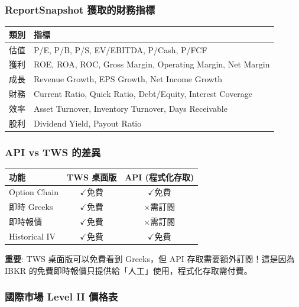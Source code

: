 \documentclass[11pt,a4paper]{article}
\newcommand{\cmark}{\textcolor{successgreen}{$\checkmark$}}
\newcommand{\xmark}{\textcolor{dangered}{$\times$}}
\begin{document}
\subsubsection{ReportSnapshot 獲取的財務指標}

\begin{table}[H]
\centering
\begin{tabular}{@{}ll@{}}
\toprule
\textbf{類別} & \textbf{指標} \\
\midrule
估值 & P/E, P/B, P/S, EV/EBITDA, P/Cash, P/FCF \\
獲利 & ROE, ROA, ROC, Gross Margin, Operating Margin, Net Margin \\
成長 & Revenue Growth, EPS Growth, Net Income Growth \\
財務 & Current Ratio, Quick Ratio, Debt/Equity, Interest Coverage \\
效率 & Asset Turnover, Inventory Turnover, Days Receivable \\
股利 & Dividend Yield, Payout Ratio \\
\bottomrule
\end{tabular}
\end{table}

\subsubsection{API vs TWS 的差異}

\begin{table}[H]
\centering
\begin{tabular}{@{}lcc@{}}
\toprule
\textbf{功能} & \textbf{TWS 桌面版} & \textbf{API (程式化存取)} \\
\midrule
Option Chain & \cmark 免費 & \cmark 免費 \\
即時 Greeks & \cmark 免費 & \xmark 需訂閱 \\
即時報價 & \cmark 免費 & \xmark 需訂閱 \\
Historical IV & \cmark 免費 & \cmark 免費 \\
\bottomrule
\end{tabular}
\end{table}

\begin{tcolorbox}[colback=warningyellow!10,colframe=warningyellow]
\textbf{重要}: TWS 桌面版可以免費看到 Greeks，但 API 存取需要額外訂閱！這是因為 IBKR 的免費即時報價只提供給「人工」使用，程式化存取需付費。
\end{tcolorbox}

\subsubsection{國際市場 Level II 價格表}
\end{document}
